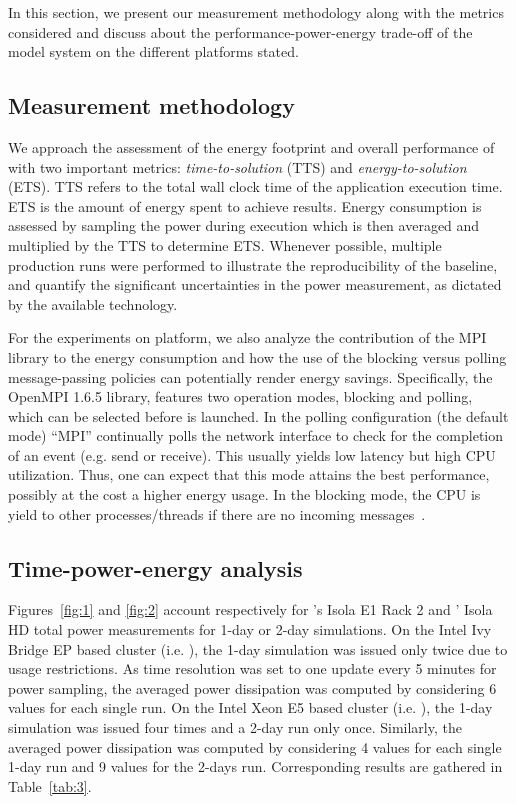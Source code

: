 In this section, we present our measurement methodology along with the
metrics considered and discuss about the performance-power-energy trade-off of the model system on the different platforms stated.

\subsection{Measurement methodology}
\label{subsec:4.1}

We  approach  the  assessment  of  the energy  footprint  and  overall
performance   of   \cosmoart   with  two   important  metrics:
\textit{time-to-solution} (TTS) and \textit{energy-to-solution} (ETS).
TTS refers to  the total wall clock time  of the application execution
time. ETS  is the amount of  energy spent to  achieve results.  Energy
consumption  is  assessed by  sampling  the  power during execution which is then averaged and multiplied  by the TTS to determine  ETS. Whenever  possible,  multiple production  runs  were
performed  to  illustrate the  reproducibility  of  the baseline,  and
quantify the  significant uncertainties  in the power  measurement, as
dictated by the available technology.

For the experiments on \tinto platform, we also analyze the contribution of the MPI library to the energy consumption and how the use of the blocking versus polling message-passing policies can potentially render energy savings. Specifically, the OpenMPI 1.6.5 library, 
features two operation modes, blocking and polling, which can be selected before \cosmoart
is launched. In the polling configuration (the default mode) ``MPI'' continually polls
the network interface to check for the completion of an event (e.g. send or receive).
This usually yields low latency but high CPU utilization. Thus, one can expect that this mode 
attains the best performance, possibly at the cost a higher energy usage. In the blocking
mode, the CPU is yield to other processes/threads if there are no incoming messages~\cite{PDP12}.

\subsection{Time-power-energy analysis}
\label{subsec:4.2}

Figures~\ref{fig:1}   and   \ref{fig:2}   account   respectively   for
\monch's Isola E1 Rack  2 and \pilat' Isola HD total
power measurements for  1-day or 2-day simulations. On  the Intel Ivy
Bridge EP  based cluster (i.e.  \monch),  the 1-day simulation
was issued  only twice due  to usage restrictions. As  time resolution
was set to one update every 5 minutes for power sampling, the averaged
power dissipation was computed by considering 6 values for each single
run.  On the Intel Xeon E5 based cluster (i.e.  \pilat), the
1-day simulation  was issued  four times and  a 2-day run  only once.
Similarly, the averaged power dissipation was computed by considering 4
values  for  each  single  1-day  run  and 9  values  for  the  2-days
run. Corresponding results are gathered in Table~\ref{tab:3}.

